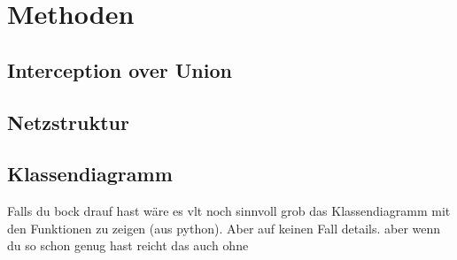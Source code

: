 \section{Methoden}

\subsection{Interception over Union}


\subsection*{Netzstruktur}

\subsection{Klassendiagramm}
Falls du bock drauf hast wäre es vlt noch sinnvoll grob das Klassendiagramm mit den Funktionen zu zeigen (aus python). Aber auf keinen Fall details. aber wenn du so schon genug hast reicht das auch ohne